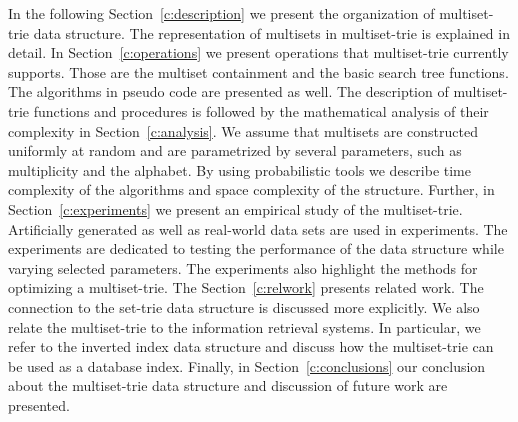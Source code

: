 %
In the following Section~\ref{c:description} we present the organization of 
multiset-trie data structure. The representation of multisets in multiset-trie is 
explained in detail.
%
In Section~\ref{c:operations} we present operations that multiset-trie currently 
supports. Those are the multiset containment and the basic search tree functions. 
The algorithms in pseudo code are presented as well. 
%
The description of multiset-trie functions and procedures is followed by the 
mathematical analysis of their complexity in Section~\ref{c:analysis}. 
We assume that multisets are constructed uniformly at random and are parametrized 
by several parameters, such as multiplicity and the alphabet. By using probabilistic 
tools we describe time complexity of the algorithms and space complexity of the structure.
%
Further, in Section~\ref{c:experiments} we present an empirical study of the 
multiset-trie. Artificially generated as well as real-world data sets are used in experiments. 
The experiments are dedicated to testing the performance of the data structure while 
varying selected parameters. The experiments also highlight the methods for optimizing a multiset-trie.
%
The Section~\ref{c:relwork} presents related work. The connection to the set-trie 
data structure \cite{savnik2013index} is discussed more explicitly. We also relate 
the multiset-trie to the information retrieval systems. In particular, we refer to the 
inverted index data structure and discuss how the multiset-trie can be used as a 
database index.
%
Finally, in Section~\ref{c:conclusions} our conclusion about the multiset-trie 
data structure and discussion of future work are presented.